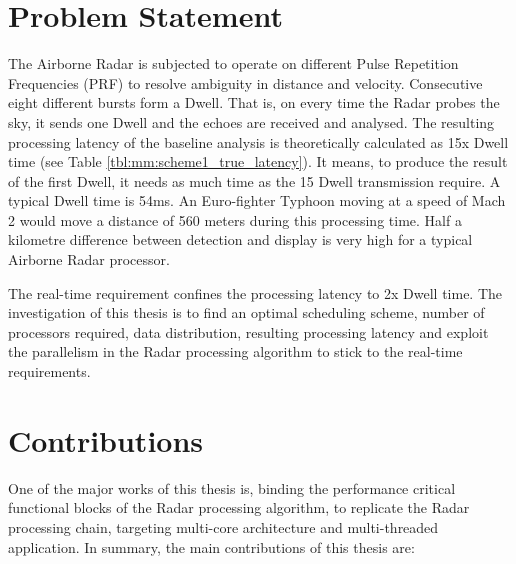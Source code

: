\section{Problem Statement}
\label{sec:intro:probstatement}
The Airborne Radar is subjected to operate on different Pulse Repetition Frequencies (PRF) to resolve ambiguity in distance and velocity. Consecutive eight different bursts form a Dwell. That is, on every time the Radar probes the sky, it sends one Dwell and the echoes are received and analysed. The resulting processing latency of the baseline analysis is theoretically calculated as 15x Dwell time (see Table \ref{tbl:mm:scheme1_true_latency}).  It means, to produce the result of the first Dwell, it needs as much time as the 15 Dwell transmission require. A typical Dwell time is 54ms. An Euro-fighter Typhoon moving at a speed of Mach 2 would move a distance of 560 meters during this processing time. Half a kilometre difference between detection and display is very high for a typical Airborne Radar processor.

The real-time requirement confines the processing latency to 2x Dwell time. The investigation of this thesis is to find an optimal scheduling scheme, number of processors required, data distribution, resulting processing latency and exploit the parallelism in the Radar processing algorithm to stick to the real-time requirements.

\section{Contributions}
\label{sec:intro:contrib}
One of the major works of this thesis is, binding the performance critical functional blocks of the Radar processing algorithm, to replicate the Radar processing chain, targeting multi-core architecture and multi-threaded application. In summary, the main contributions of this thesis are:

